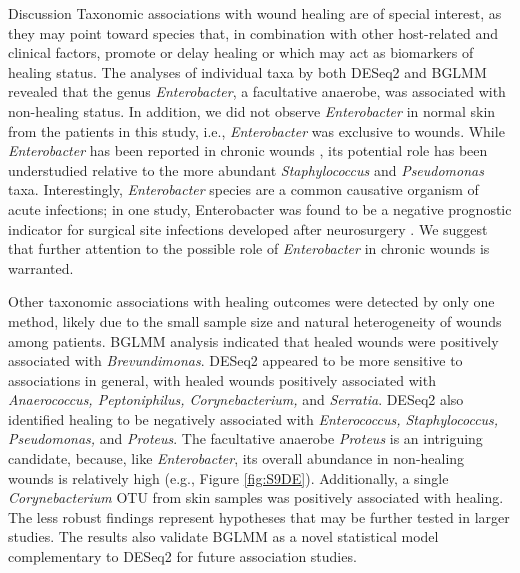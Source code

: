 \documentclass[oneside,12pt,final]{sty/ucthesis-CA2012}
\begin{document}
\begin{mainmatter}
\begin{section}{Discussion}
Taxonomic associations with wound healing are of special interest, as they may point toward species that, in combination with other host-related and clinical factors, promote or delay healing or which may act as biomarkers of healing status. The analyses of individual taxa by both DESeq2 and BGLMM revealed that the genus \textit{Enterobacter}, a facultative anaerobe, was associated with non-healing status. In addition, we did not observe \textit{Enterobacter} in normal skin from the patients in this study, i.e., \textit{Enterobacter} was exclusive to wounds. While \textit{Enterobacter} has been reported in chronic wounds \cite{RN10, RN13}, its potential role has been understudied relative to the more abundant \textit{Staphylococcus} and \textit{Pseudomonas} taxa. Interestingly, \textit{Enterobacter} species are a common causative organism of acute infections; in one study, Enterobacter was found to be a negative prognostic indicator for surgical site infections developed after neurosurgery \cite{RN40}. We suggest that further attention to the possible role of \textit{Enterobacter} in chronic wounds is warranted. 

Other taxonomic associations with healing outcomes were detected by only one method, likely due to the small sample size and natural heterogeneity of wounds among patients. BGLMM analysis indicated that healed wounds were positively associated with \textit{Brevundimonas}. DESeq2 appeared to be more sensitive to associations in general, with healed wounds positively associated with \textit{Anaerococcus, Peptoniphilus, Corynebacterium,} and \textit{Serratia}. DESeq2 also identified healing to be negatively associated with \textit{Enterococcus, Staphylococcus, Pseudomonas,} and \textit{Proteus}. The facultative anaerobe \textit{Proteus} is an intriguing candidate, because, like \textit{Enterobacter}, its overall abundance in non-healing wounds is relatively high (e.g., Figure \ref{fig:S9DE}). Additionally, a single \textit{Corynebacterium} OTU from skin samples was positively associated with healing. The less robust findings represent hypotheses that may be further tested in larger studies. The results also validate BGLMM as a novel statistical model complementary to DESeq2 for future association studies.


\end{section}
\end{mainmatter}
\end{document}
